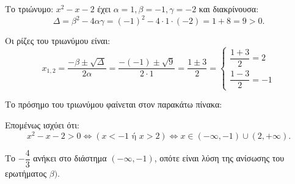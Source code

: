 
\begin{alist}
\item Το τριώνυμο: $x^2 - x - 2$ έχει $\alpha = 1, \beta = -1, \gamma = -2$ και διακρίνουσα:
\[\Delta = \beta^2 - 4\alpha\gamma = (-1)^2 - 4 \cdot 1 \cdot (-2) = 1 + 8 = 9 > 0.\]

Οι ρίζες του τριωνύμου είναι:
\[x_{1,2} = \dfrac{-\beta \pm \sqrt{\Delta}}{2\alpha} = \dfrac{-(-1) \pm \sqrt{9}}{2 \cdot 1} = \dfrac{1 \pm 3}{2} = \begin{cases} \dfrac{1 + 3}{2} = 2 \\[2ex] \dfrac{1 - 3}{2} = -1 \end{cases}\]

\item Το πρόσημο του τριωνύμου φαίνεται στον παρακάτω πίνακα:

\begin{center}
\end{center}

Επομένως ισχύει ότι:
\[x^2 - x - 2 > 0 \Leftrightarrow (x < -1 \text{ ή } x > 2) \Leftrightarrow x \in (-\infty, -1) \cup (2, +\infty).\]

\item Το $-\dfrac{4}{3}$ ανήκει στο διάστημα $(-\infty, -1)$, οπότε είναι λύση της ανίσωσης του ερωτήματος $\beta)$.
\end{alist}

